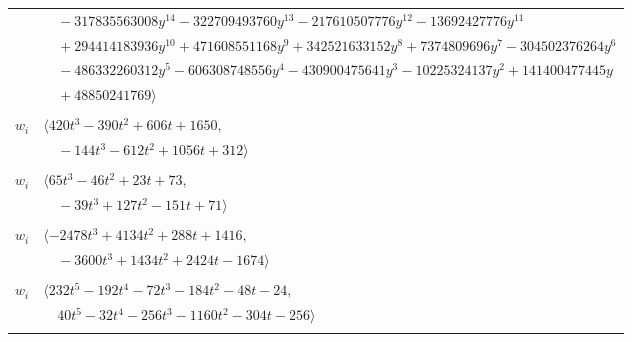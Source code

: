 \documentclass[11pt]{article}
\begin{document}
\begin{longtable}{@{}ll@{}}
 & $\quad -317835563008y^{14}-322709493760y^{13}-217610507776y^{12}-13692427776y^{11}$\\
 & $\quad +294414183936y^{10}+471608551168y^{9}+342521633152y^{8}+7374809696y^{7}-304502376264y^{6}$\\
 & $\quad -486332260312y^{5}-606308748556y^{4}-430900475641y^{3}-10225324137y^{2}+141400477445y$\\
 & $\quad +48850241769\rangle$\\
\addlinespace[2pt]
\multicolumn{2}{@{}p{0.97\textwidth}@{}}{$i=65$, $D_i=8$, $\rho_{ij}$: $11{:}1, \allowbreak 19{:}2, \allowbreak 23{:}1, \allowbreak 26{:}1, \allowbreak 30{:}1, \allowbreak 35{:}2, \allowbreak 37{:}2, \allowbreak 38{:}2, \allowbreak 40{:}2, \allowbreak 43{:}1, \allowbreak 49{:}1, \allowbreak 61{:}2$}\\
$w_i$ & $\langle 420t^{3}-390t^{2}+606t+1650,$\\
 & $\quad -144t^{3}-612t^{2}+1056t+312\rangle$\\
\addlinespace[2pt]
\multicolumn{2}{@{}p{0.97\textwidth}@{}}{$i=66$, $D_i=2$, $\rho_{ij}$: $6{:}1, \allowbreak 16{:}1, \allowbreak 23{:}2, \allowbreak 30{:}2, \allowbreak 37{:}1, \allowbreak 46{:}2, \allowbreak 51{:}1, \allowbreak 64{:}2, \allowbreak 67{:}1$}\\
$w_i$ & $\langle 65t^{3}-46t^{2}+23t+73,$\\
 & $\quad -39t^{3}+127t^{2}-151t+71\rangle$\\
\addlinespace[2pt]
\multicolumn{2}{@{}p{0.97\textwidth}@{}}{$i=67$, $D_i=32$, $\rho_{ij}$: $6{:}1, \allowbreak 13{:}1, \allowbreak 14{:}2, \allowbreak 19{:}1, \allowbreak 28{:}2, \allowbreak 30{:}2, \allowbreak 41{:}2, \allowbreak 44{:}2, \allowbreak 46{:}2, \allowbreak 51{:}2, \allowbreak 54{:}1, \allowbreak 64{:}2, \allowbreak 66{:}2$}\\
$w_i$ & $\langle -2478t^{3}+4134t^{2}+288t+1416,$\\
 & $\quad -3600t^{3}+1434t^{2}+2424t-1674\rangle$\\
\addlinespace[2pt]
\multicolumn{2}{@{}p{0.97\textwidth}@{}}{$i=68$, $D_i=8$, $\rho_{ij}$: $0{:}2, \allowbreak 5{:}1, \allowbreak 6{:}2, \allowbreak 14{:}2, \allowbreak 16{:}2, \allowbreak 21{:}2, \allowbreak 23{:}1, \allowbreak 41{:}1, \allowbreak 43{:}2, \allowbreak 44{:}2, \allowbreak 49{:}2, \allowbreak 51{:}1, \allowbreak 53{:}2$}\\
$w_i$ & $\langle 232t^{5}-192t^{4}-72t^{3}-184t^{2}-48t-24,$\\
 & $\quad 40t^{5}-32t^{4}-256t^{3}-1160t^{2}-304t-256\rangle$\\
\addlinespace[2pt]
\end{longtable}
\endgroup
\end{document}
